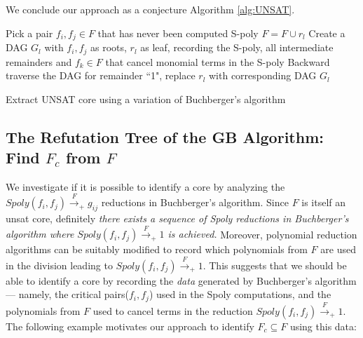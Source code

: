 We conclude our approach as a conjecture Algorithm \ref{alg:UNSAT}. 

\begin{algorithm}[hbt]
\SetAlgoNoLine
{
	Pick a pair $f_i,f_j\in F$ that has never been computed S-poly\;
	{
		$F = F\cup r_l$\;
		Create a DAG $G_l$ with $f_i,f_j$ as roots, $r_l$ as leaf, recording the S-poly, all intermediate remainders and $f_k\in F$ that cancel monomial terms in the S-poly\;
	}
}
Backward traverse the DAG for remainder ``1", replace $r_l$ with corresponding DAG $G_l$\;
\caption {Extract UNSAT core using a variation of Buchberger's algorithm}\label{alg:UNSAT}
\end{algorithm}

\subsection{The Refutation Tree of the GB Algorithm: Find $F_c$ from $F$}

We investigate if it is possible to identify a core by analyzing the
$Spoly(f_i,f_j)\xrightarrow{F}_+ g_{ij}$ reductions in Buchberger's
algorithm. Since $F$ is itself an unsat core, 
definitely {\it there exists  
a sequence of Spoly reductions in Buchberger's algorithm where
$Spoly(f_i, f_j) \xrightarrow{F}_+ 1$ is achieved.} Moreover, 
polynomial reduction algorithms can be suitably modified to record
which polynomials from $F$ are used in the division leading to
$Spoly(f_i,f_j)\xrightarrow{F}_+1$. This suggests that 
we should be able to identify a core by recording
the {\it data} generated by Buchberger's algorithm --- namely, the
critical pairs($f_i,f_j$) used in the Spoly computations,
and the polynomials from $F$ used to cancel terms in the reduction
$Spoly(f_i,f_j)\xrightarrow{F}_+1$. The following example motivates
our approach to identify  $F_c \subseteq F$ using this data:

